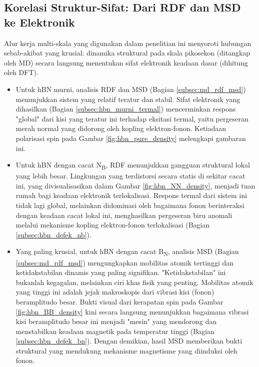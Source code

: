 \subsection{Korelasi Struktur-Sifat: Dari RDF dan MSD ke Elektronik}
\label{subsec:korelasi_struktur_md_dft}
Alur kerja multi-skala yang digunakan dalam penelitian ini menyoroti hubungan sebab-akibat yang krusial: dinamika struktural pada skala pikosekon (ditangkap oleh MD) secara langsung menentukan sifat elektronik keadaan dasar (dihitung oleh DFT).
\begin{itemize}
    \item Untuk hBN murni, analisis RDF dan MSD (Bagian \ref{subsec:md_rdf_msd}) menunjukkan sistem yang relatif teratur dan stabil.
Sifat elektronik yang dihasilkan (Bagian \ref{subsec:hbn_murni_termal}) mencerminkan respons "global" dari kisi yang teratur ini terhadap eksitasi termal, yaitu pergeseran merah normal yang didorong oleh kopling elektron-fonon.
Ketiadaan polarisasi spin pada Gambar \ref{fig:hbn_pure_density} melengkapi gambaran ini.
    \item Untuk hBN dengan cacat N\textsubscript{B}, RDF menunjukkan gangguan struktural lokal yang lebih besar.
Lingkungan yang terdistorsi secara statis di sekitar cacat ini, yang divisualisasikan dalam Gambar \ref{fig:hbn_NN_density}, menjadi tuan rumah bagi keadaan elektronik terlokalisasi.
Respons termal dari sistem ini tidak lagi global, melainkan didominasi oleh bagaimana fonon berinteraksi dengan keadaan cacat lokal ini, menghasilkan pergeseran biru anomali melalui mekanisme kopling elektron-fonon terlokalisasi (Bagian \ref{subsec:hbn_defek_nb}).
\item Yang paling krusial, untuk hBN dengan cacat B\textsubscript{N}, analisis MSD (Bagian \ref{subsec:md_rdf_msd}) mengungkapkan mobilitas atomik tertinggi dan ketidakstabilan dinamis yang paling signifikan.
"Ketidakstabilan" ini bukanlah kegagalan, melainkan ciri khas fisik yang penting.
Mobilitas atomik yang tinggi ini adalah jejak makroskopis dari vibrasi kisi (fonon) beramplitudo besar.
Bukti visual dari kerapatan spin pada Gambar \ref{fig:hbn_BB_density} kini secara langsung menunjukkan bagaimana vibrasi kisi beramplitudo besar ini menjadi "mesin" yang mendorong dan menstabilkan keadaan magnetik pada temperatur tinggi (Bagian \ref{subsec:hbn_defek_bn}).
Dengan demikian, hasil MSD memberikan bukti struktural yang mendukung mekanisme magnetisme yang diinduksi oleh fonon.
\end{itemize}

